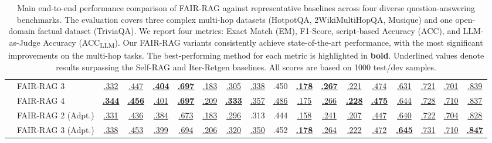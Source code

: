 \documentclass[11pt]{article}
\begin{document}
\begin{table}[t]
\begin{tabular}{llcccccccccccccccc}
& FAIR-RAG 3 & \underline{.332} & \underline{.447} & \underline{\textbf{.404}} & \underline{\textbf{.697}} & \underline{.183} & \underline{.305} & \underline{.338} & .450 & \underline{\textbf{.178}} & \underline{\textbf{.267}} & \underline{.221} & \underline{.474} & \underline{.631} & \underline{.721} & \underline{.701} & \underline{.839} \\
& FAIR-RAG 4 & \underline{\textbf{.344}} & \underline{\textbf{.456}} & \underline{.401} & \underline{\textbf{.697}} & \underline{.209} & \underline{\textbf{.333}} & \underline{.357} & \underline{.486} & \underline{.175} & \underline{.266} & \underline{\textbf{.228}} & \underline{\textbf{.475}} & \underline{.644} & \underline{.728} & \underline{.710} & \underline{.837} \\
& FAIR-RAG 2 (Adpt.) & \underline{.331} & \underline{.436} & \underline{.384} & \underline{.673} & \underline{.183} & \underline{.296} & .313 & .444 & \underline{.158} & \underline{.241} & \underline{.207} & \underline{.447} & \underline{.640} & \underline{.722} & \underline{.704} & \underline{.828} \\
& FAIR-RAG 3 (Adpt.) & \underline{.338} & \underline{.453} & \underline{.399} & \underline{.694} & \underline{.206} & \underline{.320} & \underline{.350} & .452 & \underline{\textbf{.178}} & \underline{.264} & \underline{.222} & \underline{.472} & \underline{\textbf{.645}} & \underline{.731} & \underline{.710} & \underline{\textbf{.847}} \\
\hline
\end{tabular}
\caption{Main end-to-end performance comparison of FAIR-RAG against representative baselines across four diverse question-answering benchmarks. The evaluation covers three complex multi-hop datasets (HotpotQA, 2WikiMultiHopQA, Musique) and one open-domain factual dataset (TriviaQA). We report four metrics: Exact Match (EM), F1-Score, script-based Accuracy (ACC), and LLM-as-Judge Accuracy (ACC\textsubscript{LLM}). Our FAIR-RAG variants consistently achieve state-of-the-art performance, with the most significant improvements on the multi-hop tasks. The best-performing method for each metric is highlighted in \textbf{bold}. Underlined values denote results surpassing the Self-RAG and Iter-Retgen baselines. All scores are based on 1000 test/dev samples.}
\label{tab:main-results}
\end{table}
\end{document}
